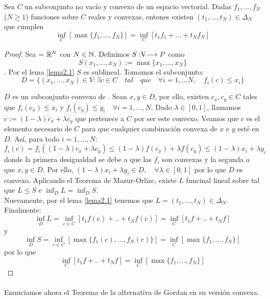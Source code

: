 	\begin{lemaBox}\label{Simons}
		Sea $ C $ un subconjunto no vacío y convexo de un espacio vectorial. Dadas $ f_1, ..., f_N $ ($ N \geq 1 $)  funciones sobre $ C $ reales y convexas, entones existen $ (t_1, ..., t_N) \in \Delta_N $ que cumplen
		\[
		\inf_C\left[ \max \{f_1, ..., f_N\}\right] = \inf_C \left[ t_1 f_1+ ...+t_N f_N \right]
		\] 
	\end{lemaBox}
	\begin{proof}
		Sea  \vecSpace = $ \mathbb{R}^N $ con $ N \in \mathbb{N} $. Definimos $S:\vecSpace \longrightarrow P $ como \[ S(x_1, ..., x_N) := \max \{x_1, ..., x_N\} \]. Por el lema \ref{lema2.1} $ S $ es sublineal. Tomamos el subconjunto:
		\[ 
		D = \{ (x_1, ..., x_N)\in V: \exists c \in C \quad tal \quad que \quad \forall i = 1,...N,\quad f_i(c) \leq x_i \}
		\]
		
		$ D $ es un subconjunto convexo de \vecSpace. Sean $ x, y \in D $, por ello, existen $ c_x, c_y \in C $ tales que $ f_i (c_x) \leq x_i  $ y $ f_i (c_y) \leq y_i \quad \forall i=1,...,N $. Dado $ \lambda \in [0,1] $, llamamos $ c := (1-\lambda)c_x + \lambda c_y $ que pertenece a $ C $ por ser este convexo. Veamos que $ c $ es el elemento necesario de $ C $ para que cualquier combinación convexa de $ x $ e $ y $ esté en $ D $. Así, para todo $ i =1,...,N  $:	
		\[
		f_i(c) = f_i((1-\lambda)c_x + \lambda c_y) \leq (1-\lambda)f(c_x) + \lambda f(c_y) \leq (1-\lambda)x_i + \lambda y_i 
		\]
		donde la primera desigualdad se debe a que las $ f_i $ son convexas y la segunda a que $ x,y \in D $. Por ello, $ (1-\lambda)x_i + \lambda y_i \in D , \quad \forall \lambda \in [0,1] $ por lo que $ D $ es convexo. Aplicando el Teorema de Mazur-Orlizc, existe $ L $ funcinal lineal sobre \vecSpace tal que $ L \leq S $ e $ \inf_D L = \inf_D S $. \\
		
		Nuevamente, por el lema \ref{lema2.1} tenemos que $ L = (t_1,...,t_N) \in \Delta_N$. \\
		
		Finalmente:
		\[
		\inf_D L = \inf_{c\in C} \left[ t_1 f(c) + ..+ t_N f(c) \right] = \inf_{C} \left[ t_1 f + ..+ t_N f \right]
		\]
		y
		\[
		\inf_D S = \inf_{c\in C} \left[ \max \{f_1(c), ..., f_N(c)\} \right] = \inf_C\left[ \max \{f_1, ..., f_N\}\right] 
		\]
		por lo que 
		\[ \inf_{C} \left[ t_1 f + ..+ t_N f \right] = \inf_C\left[ \max \{f_1, ..., f_N\}\right]  \] 
	\end{proof}

	\paragraph{}Enunciamos ahora el Teorema de la alternativa de Gordan en su versión convexa.
	
